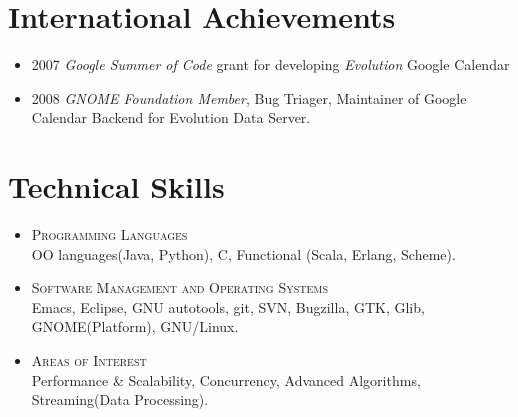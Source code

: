 \documentclass[a4paper,10pt]{article}
\begin{document}
\section{International Achievements}
  \begin{itemize}
  \item \textsc{2007} \emph{Google Summer of Code} grant for developing \emph{Evolution} Google Calendar
  \item \textsc{2008} \emph{GNOME Foundation Member}, Bug Triager, Maintainer of Google Calendar Backend for Evolution Data Server.
  \end{itemize}
    
\section{Technical Skills}
  \begin{itemize}
  \item \textsc{Programming Languages} \\
    OO languages(Java, Python), C, Functional (Scala, Erlang, Scheme).    
  \item \textsc{Software Management and Operating Systems} \\
    Emacs, Eclipse, GNU autotools, git, SVN, Bugzilla, GTK, Glib, GNOME(Platform), GNU/Linux.
  \item \textsc{Areas of Interest} \\
    Performance \& Scalability, Concurrency, Advanced Algorithms, Streaming(Data Processing).
  \end{itemize}
  
\end{document}
